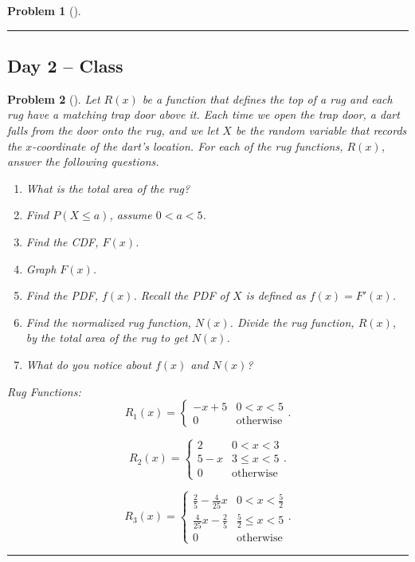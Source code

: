 \documentclass[letterpaper,oneside]{book}%
\theoremstyle{plain}
\theoremstyle{box}
\theoremstyle{problem}
\newtheorem{problemnum}{Problem}[chapter]
\newenvironment{problem}[1][]{\begin{problemnum}[#1]}{\end{problemnum}\nopagebreak\hrule\bigskip}
\begin{document}
\begin{problem}
\end{problem}



\subsection{Day 2 -- Class}
\begin{problem}
\label{D2_GeoRugs}
Let $R(x)$ be a function that defines the top of a rug and each rug have a matching trap door above it. Each time we open the trap door, a dart falls from the door onto the rug, and we let $X$ be the random variable that records the $x$-coordinate of the dart's location. For each of the rug functions, $R(x)$, answer the following questions.
\begin{enumerate}
\item What is the total area of the rug?
\item Find $P(X \leq a)$, assume $0 < a < 5$.
\item Find the CDF, $F(x)$.
\item Graph $F(x)$.
\item Find the PDF, $f(x)$. Recall the PDF of $X$ is defined as $f(x) = F'(x)$.
\item Find the normalized rug function, $N(x)$. Divide the rug function, $R(x)$, by the total area of the rug to get $N(x)$. 
\item What do you notice about $f(x)$ and $N(x)$?
\end{enumerate}

Rug Functions:
$$R_1(x) = 
    \begin{cases}
    -x + 5 & 0 < x < 5 \\
    0 & \text{otherwise}
    \end{cases}.$$

$$R_2(x) = 
    \begin{cases}
    2 & 0 < x < 3 \\
    5 - x & 3 \leq x < 5 \\
    0 & \text{otherwise}
    \end{cases}.$$

$$R_3(x) = 
    \begin{cases}
    \frac{2}{5}-\frac{4}{25}x & 0 < x < \frac{5}{2} \\
    \frac{4}{25}x - \frac{2}{5} & \frac{5}{2} \leq x < 5 \\
    0 & \text{otherwise}
    \end{cases}.$$
\end{problem}
\end{document}

